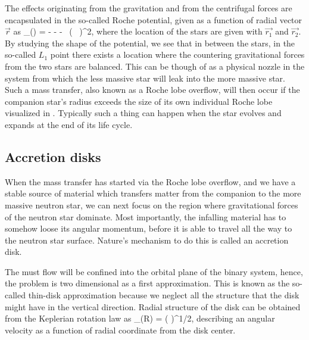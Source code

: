 The effects originating from the gravitation and from the centrifugal forces are encapsulated in the so-called Roche potential, given as a function of radial vector $\vec{r}$ as\cite[see, e.g.,][]{PRP02, LL15}
\be
\Phi_{}() = - - -  ( \vec{ \omega } \times {} )^2,
\ee
where the location of the stars are given with $\vec{r_1}$ and $\vec{r_2}$.
By studying the shape of the potential, we see that in between the stars, in the so-called $L_1$ point there exists a location where the countering gravitational forces from the two stars are balanced.
This can be though of as a physical nozzle in the system from which the less massive star will leak into the more massive star.
Such a mass transfer, also known as a Roche lobe overflow, will then occur if the companion star's radius exceeds the size of its own individual Roche lobe visualized in .
Typically such a thing can happen when the star evolves and expands at the end of its life cycle. 


\subsection{Accretion disks}

When the mass transfer has started via the Roche lobe overflow, and we have a stable source of material which transfers matter from the companion to the more massive neutron star, we can next focus on the region where gravitational forces of the neutron star dominate.
Most importantly, the infalling material has to somehow loose its angular momentum, before it is able to travel all the way to the neutron star surface.
Nature's mechanism to do this is called an accretion disk.


The must flow will be confined into the orbital plane of the binary system, hence, the problem is two dimensional as a first approximation.
This is known as the so-called thin-disk approximation because we neglect all the structure that the disk might have in the vertical direction.
Radial structure of the disk can be obtained from the Keplerian rotation law as
\be
\Omega_{}(R) = \left(  \right)^{1/2},
\ee
describing an angular velocity as a function of radial coordinate from the disk center.

